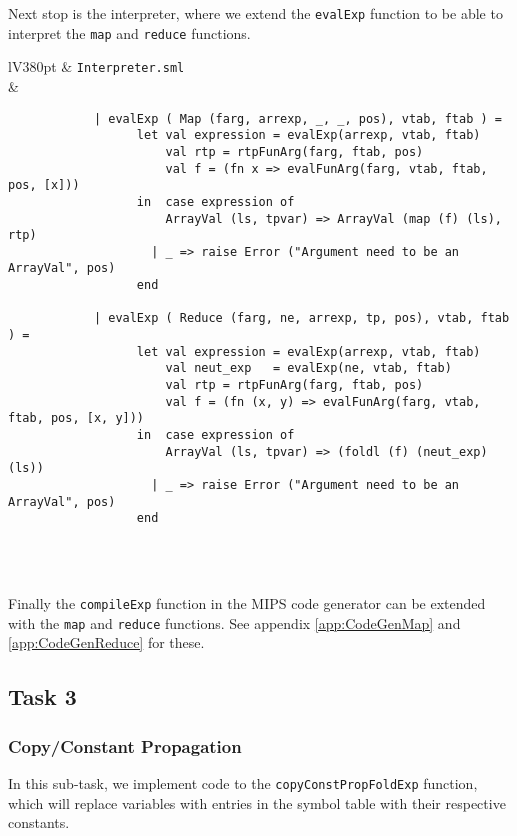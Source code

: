 \documentclass[a4paper]{article}
\begin{document}
Next stop is the interpreter, where we extend the \verb|evalExp| function to be able to interpret the \verb|map| and \verb|reduce| functions.
	
\begin{center}	
	\begin{tabular}{lV{380pt}}
		\toprule
		& \verb|Interpreter.sml|\\
		\midrule
		&
		\begin{verbatim}		
			| evalExp ( Map (farg, arrexp, _, _, pos), vtab, ftab ) =
			      let val expression = evalExp(arrexp, vtab, ftab)
			          val rtp = rtpFunArg(farg, ftab, pos)
			          val f = (fn x => evalFunArg(farg, vtab, ftab, pos, [x]))
			      in  case expression of
			          ArrayVal (ls, tpvar) => ArrayVal (map (f) (ls), rtp)
			        | _ => raise Error ("Argument need to be an ArrayVal", pos)
			      end
			
			| evalExp ( Reduce (farg, ne, arrexp, tp, pos), vtab, ftab ) =
			      let val expression = evalExp(arrexp, vtab, ftab)
			          val neut_exp   = evalExp(ne, vtab, ftab)
			          val rtp = rtpFunArg(farg, ftab, pos)
			          val f = (fn (x, y) => evalFunArg(farg, vtab, ftab, pos, [x, y]))
			      in  case expression of
			          ArrayVal (ls, tpvar) => (foldl (f) (neut_exp) (ls))
			        | _ => raise Error ("Argument need to be an ArrayVal", pos)
			      end
		\end{verbatim}
		\\
		\bottomrule \\
	\end{tabular}
\end{center}
	
Finally the \verb|compileExp| function in the MIPS code generator can be extended with the \verb|map| and \verb|reduce| functions. See appendix \ref{app:CodeGenMap} and \ref{app:CodeGenReduce} for these.

\subsection{Task 3}

\subsubsection{Copy/Constant Propagation}

In this sub-task, we implement code to the \verb|copyConstPropFoldExp| function, which will replace variables with entries in the symbol table with their respective constants.
\end{document}
